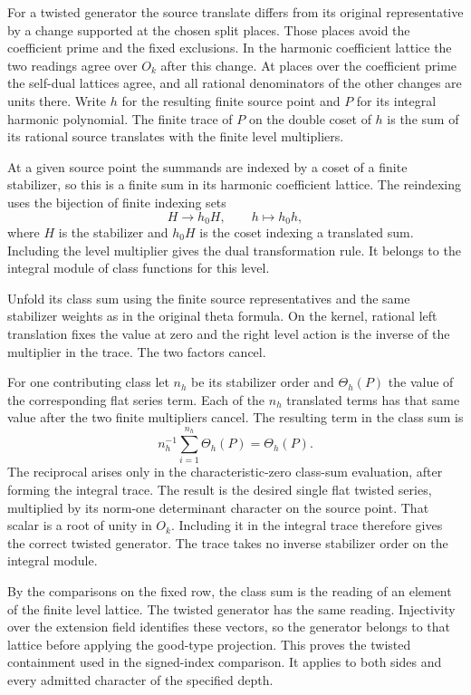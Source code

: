 For a twisted generator the source translate
differs from its original representative by a
change supported at the chosen split places.
Those places avoid the coefficient prime and
the fixed exclusions. In the harmonic coefficient
lattice the two readings agree over \(O_k\) after
this change. At places over the coefficient prime
the self-dual lattices agree, and all rational
denominators of the other changes are units there.
Write \(h\) for the resulting finite source point
and \(P\) for its integral harmonic polynomial.
The finite trace of \(P\) on the double coset
of \(h\) is the sum of its rational source
translates with the finite level multipliers.

At a given source point the summands are indexed
by a coset of a finite stabilizer, so this is
a finite sum in its harmonic coefficient lattice.
The reindexing uses the bijection of finite indexing sets
\[
 H\longrightarrow h_0H,\qquad h\longmapsto h_0h,
\]
where \(H\) is the stabilizer and \(h_0H\) is the coset indexing a translated sum. Including the level multiplier gives the dual transformation rule. It belongs to the integral module
of class functions for this level.

Unfold its class sum using the finite source
representatives and the same stabilizer weights
as in the original theta formula. On the kernel,
rational left translation fixes the value at
zero and the right level action is the inverse
of the multiplier in the trace. The two factors
cancel.

For one contributing class let \(n_h\) be its stabilizer
order and \(\Theta_h(P)\) the value of the corresponding
flat series term. Each of the \(n_h\) translated terms
has that same value after the two finite multipliers cancel.
The resulting term in the class sum is
\[
       n_h^{-1}\sum_{i=1}^{n_h}\Theta_h(P)=\Theta_h(P).
\]
The reciprocal arises only in the characteristic-zero
class-sum evaluation, after forming the integral trace. The result is the desired single flat
twisted series, multiplied by its norm-one
determinant character on the source point.
That scalar is a root of unity in \(O_k\).
Including it in the integral trace therefore gives
the correct twisted generator. The trace takes
no inverse stabilizer order on the integral
module.

By the comparisons on the fixed row, the class
sum is the reading of an element of the finite
level lattice. The twisted generator has the same
reading. Injectivity over the extension field
identifies these vectors, so the generator belongs
to that lattice before applying the good-type
projection. This proves the twisted containment
used in the signed-index comparison. It applies
to both sides and every admitted character of
the specified depth. \label{cor:theta-row-rank-3}
